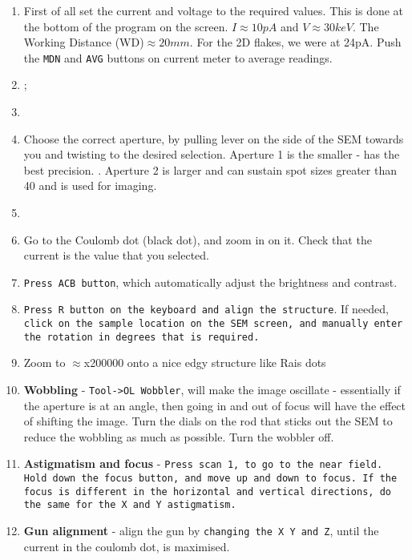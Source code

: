   \begin{enumerate}
  \item  First of  all set  the current  and voltage  to the  required
    values.  This  is  done  at  the bottom  of  the  program  on  the
    screen. $I\approx10pA$  and $V\approx30keV$. The  Working Distance
    (WD)$\approx20mm$. For  the 2D flakes,  we were at  24pA.   Push  the
    \texttt{MDN} and \texttt{AVG} buttons  on current meter to average
    readings.
  \item  {};
  \item {}
  \item Choose the  correct aperture, by pulling lever on  the side of
    the   SEM    towards   you    and   twisting   to    the   desired
    selection.   Aperture  1   is   the  smaller   -   has  the   best
    precision. . Aperture 2 is larger
    and  can sustain  spot  sizes  greater than  40  and  is used  for
    imaging.
  \item {}
  \item Go to  the Coulomb dot (black  dot), and zoom in  on it. Check
    that the current is the value that you selected.
  \item  \texttt{Press ACB  button},  which  automatically adjust  the
    brightness and contrast.
  \item  \texttt{Press  R  button  on   the  keyboard  and  align  the
      structure}. If  needed, \texttt{click on the  sample location on
      the SEM screen, and manually  enter the rotation in degrees that
      is required.}
  \item Zoom to $\approx$x200000 onto  a nice edgy structure like Rais
    dots
  \item \textbf{Wobbling}  - \texttt{Tool->OL Wobbler}, will  make the
    image oscillate - essentially if the aperture is at an angle, then
    going in  and out of  focus will have  the effect of  shifting the
    image. Turn the dials on the rod that sticks out the SEM to reduce
    the wobbling as much as possible. Turn the wobbler off.
  \item \textbf{Astigmatism and  focus} - \texttt{Press scan  1, to go
      to the near  field. Hold down the focus button,  and move up and
      down to focus.  If the focus is different in  the horizontal and
      vertical directions, do the same for the X and Y astigmatism.}
  \item \textbf{Gun alignment} - align the gun by \texttt{changing the
      X Y and Z}, until the current in the coulomb dot, is maximised.
  \end{enumerate}


